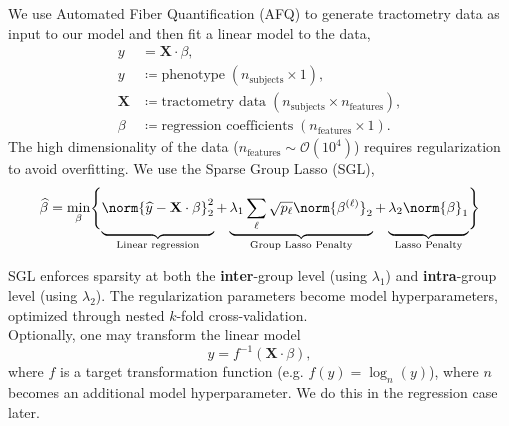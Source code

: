 \documentclass[a0, landscape]{a0poster}
\begin{document}
\begin{multicols}{3}
We use Automated Fiber Quantification (AFQ) to generate tractometry data as input to our model and then fit a linear model to the data,
\begin{align}
    y &= \mathbf{X} \cdot \beta, \\
    y &\coloneqq \text{phenotype} \; (n_\text{subjects} \times 1), \nonumber \\
    \mathbf{X} &\coloneqq \text{tractometry data} \; (n_\text{subjects} \times n_\text{features}), \nonumber \\
    \beta &\coloneqq \text{regression coefficients} \; (n_\text{features} \times 1). \nonumber
\end{align}
The high dimensionality of the data ($n_\text{features} \sim \mathcal{O}(10^4)$) requires regularization to avoid overfitting. We use the Sparse Group Lasso (SGL),
\begin{equation}
    \widehat{\beta} = \min_\beta \Biggl\{ 
        \underbrace{
            \vphantom{\lambda_1 \displaystyle \sum_\ell \sqrt{p_\ell} \norm{\beta^{(\ell)}}_2}
            \norm{\widehat{y} - \mathbf{X} \cdot \beta}_2^2
        }_{\text{Linear regression}}
        + \underbrace{
            \lambda_1 \displaystyle \sum_\ell \sqrt{p_\ell} \norm{\beta^{(\ell)}}_2
        }_{\text{Group Lasso Penalty}}
        + \underbrace{
            \vphantom{\lambda_1 \displaystyle \sum_\ell \sqrt{p_\ell} \norm{\beta^{(\ell)}}_2}
            \lambda_2 \norm{\beta}_1
        }_{\text{Lasso Penalty}}
    \Biggl\}
\end{equation}

\vfill
\columnbreak

SGL enforces sparsity at both the \textbf{inter}-group level (using $\lambda_1$) and \textbf{intra}-group level (using $\lambda_2$). The regularization parameters become model hyperparameters, optimized through nested $k$-fold cross-validation. \\
\noindent Optionally, one may transform the linear model
\begin{equation}
    y = f^{-1} \left( \mathbf{X} \cdot \beta \right),
\end{equation}
where $f$ is a target transformation function (e.g. $f(y) = \log_n(y)$), where
$n$ becomes an additional model hyperparameter. We do this in the regression case later.

\color{Navy}



\end{multicols}
\end{document}
